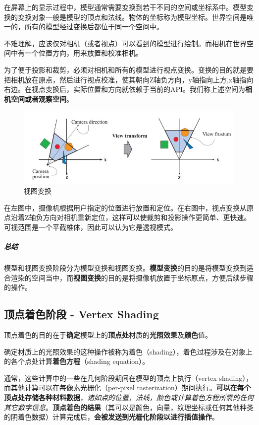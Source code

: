 \documentclass[UTF8,a4paper,12pt]{ctexbook}
\begin{document}
			在屏幕上的显示过程中，模型通常需要变换到若干不同的空间或坐标系中。模型变换的变换对象一般是模型的顶点和法线。物体的坐标称为模型坐标。世界空间是唯一的，所有的模型经过变换后都位于同一个空间中。
			
			不难理解，应该仅对相机（或者视点）可以看到的模型进行绘制。而相机在世界空间中有一个位置方向，用来放置和校准相机。
			
			为了便于投影和裁剪，必须对相机和所有的模型进行视点变换。变换的目的就是要把相机放在原点，然后进行视点校准，使其朝向Z轴负方向，y轴指向上方,x轴指向右边。在视点变换后，实际位置和方向就依赖于当前的API。我们称上述空间为\textbf{相机空间或者观察空间}。
		
				\begin{figure}[H]
					\centering
					\includegraphics[scale=0.66]{ModelViewTransform}
					\caption{视图变换}
				\end{figure}
			
			在左图中，摄像机根据用户指定的位置进行放置和定位。在右图中，视点变换从原点沿着Z轴负方向对相机重新定位，这样可以使裁剪和投影操作更简单、更快速。可视范围是一个平截椎体，因此可以认为它是透视模式。	
			
			\subparagraph{总结}模型和视图变换阶段分为模型变换和视图变换。\textbf{模型变换}的目的是将模型变换到适合渲染的空间当中，而\textbf{视图变换}的目的是将摄像机放置于坐标原点，方便后续步骤的操作。
			
		\subsection{顶点着色阶段 - Vertex Shading} 
			顶点着色的目的在于\textbf{确定}模型上的\textbf{顶点处}材质的\textbf{光照效果}及\textbf{颜色}值。
			
			\color{blue}确定材质上的光照效果的这种操作被称为着色（shading），\color{black}着色过程涉及在对象上的各个点处计算\textbf{着色方程}（shading equation）。
			
			通常，这些计算中的一些在几何阶段期间在模型的顶点上执行（vertex shading），而其他计算可以在每像素光栅化（per-pixel rasterization）期间执行。\textbf{可以在每个顶点处存储各种材料数据}，\textit{诸如点的位置，法线，颜色或计算着色方程所需的任何其它数字信息}。\color{red}\textbf{顶点着色的结果}（其可以是颜色，向量，纹理坐标或任何其他种类的阴着色数据）计算完成后，\textbf{会被发送到光栅化阶段以进行插值操作}。\color{black}
			
\end{document}
